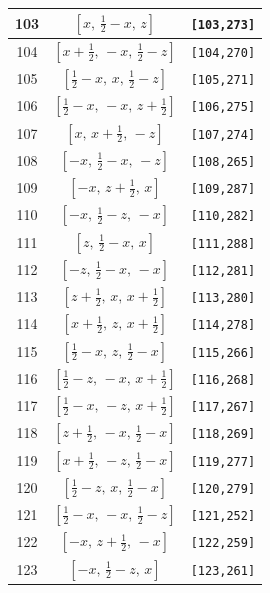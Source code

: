\documentclass[fleqn,8pt]{jsarticle}
\begin{document}
\begin{longtable}{ccc}
103 & $\left[ x,\, \frac{1}{2} - x,\, z \right]$ & {\tt [103,273]} \\ \hline
104 & $\left[ x + \frac{1}{2},\, - x,\, \frac{1}{2} - z \right]$ & {\tt [104,270]} \\ \hline
105 & $\left[ \frac{1}{2} - x,\, x,\, \frac{1}{2} - z \right]$ & {\tt [105,271]} \\ \hline
106 & $\left[ \frac{1}{2} - x,\, - x,\, z + \frac{1}{2} \right]$ & {\tt [106,275]} \\ \hline
107 & $\left[ x,\, x + \frac{1}{2},\, - z \right]$ & {\tt [107,274]} \\ \hline
108 & $\left[ - x,\, \frac{1}{2} - x,\, - z \right]$ & {\tt [108,265]} \\ \hline
109 & $\left[ - x,\, z + \frac{1}{2},\, x \right]$ & {\tt [109,287]} \\ \hline
110 & $\left[ - x,\, \frac{1}{2} - z,\, - x \right]$ & {\tt [110,282]} \\ \hline
111 & $\left[ z,\, \frac{1}{2} - x,\, x \right]$ & {\tt [111,288]} \\ \hline
112 & $\left[ - z,\, \frac{1}{2} - x,\, - x \right]$ & {\tt [112,281]} \\ \hline
113 & $\left[ z + \frac{1}{2},\, x,\, x + \frac{1}{2} \right]$ & {\tt [113,280]} \\ \hline
114 & $\left[ x + \frac{1}{2},\, z,\, x + \frac{1}{2} \right]$ & {\tt [114,278]} \\ \hline
115 & $\left[ \frac{1}{2} - x,\, z,\, \frac{1}{2} - x \right]$ & {\tt [115,266]} \\ \hline
116 & $\left[ \frac{1}{2} - z,\, - x,\, x + \frac{1}{2} \right]$ & {\tt [116,268]} \\ \hline
117 & $\left[ \frac{1}{2} - x,\, - z,\, x + \frac{1}{2} \right]$ & {\tt [117,267]} \\ \hline
118 & $\left[ z + \frac{1}{2},\, - x,\, \frac{1}{2} - x \right]$ & {\tt [118,269]} \\ \hline
119 & $\left[ x + \frac{1}{2},\, - z,\, \frac{1}{2} - x \right]$ & {\tt [119,277]} \\ \hline
120 & $\left[ \frac{1}{2} - z,\, x,\, \frac{1}{2} - x \right]$ & {\tt [120,279]} \\ \hline
121 & $\left[ \frac{1}{2} - x,\, - x,\, \frac{1}{2} - z \right]$ & {\tt [121,252]} \\ \hline
122 & $\left[ - x,\, z + \frac{1}{2},\, - x \right]$ & {\tt [122,259]} \\ \hline
123 & $\left[ - x,\, \frac{1}{2} - z,\, x \right]$ & {\tt [123,261]} \\ \hline

\end{longtable}
\end{document}
